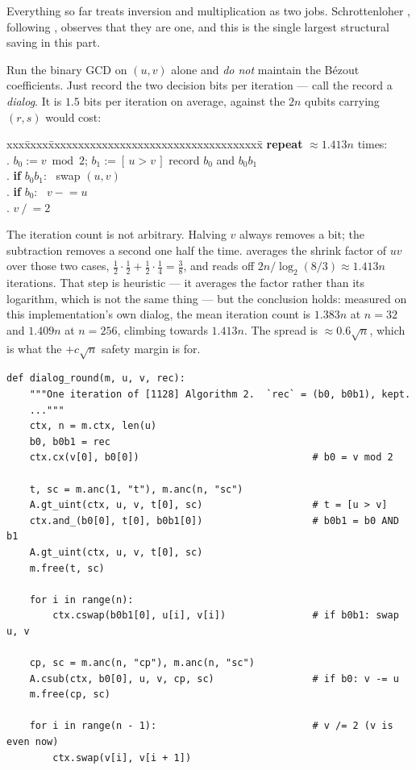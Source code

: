 \documentclass[11pt]{article}
\theoremstyle{plain}
\theoremstyle{remark}
\begin{document}
Everything so far treats inversion and multiplication as two jobs. Schrottenloher
\cite{ec:schrott26}, following \cite{ec:khattar25}, observes that they are one, and this is the
single largest structural saving in this part.

Run the binary GCD on $(u,v)$ alone and \emph{do not} maintain the B\'ezout coefficients. Just
record the two decision bits per iteration --- call the record a \emph{dialog}. It is $1.5$ bits
per iteration on average, against the $2n$ qubits carrying $(r,s)$ would cost:

\begin{center}\small
\begin{minipage}{0.82\textwidth}
\begin{tabbing}
xxx\=xxxx\=xxxxxxxxxxxxxxxxxxxxxxxxxxxxxxxxxxxx\=\kill
\> \textbf{repeat} $\approx1.413n$ times:\\
.\> $b_0 := v \bmod 2$; \quad $b_1 := [\,u>v\,]$ \> record $b_0$ and $b_0b_1$\\
.\> \textbf{if} $b_0b_1$: \ swap $(u,v)$\\
.\> \textbf{if} $b_0$: \ $v \mathrel{-}= u$\\
.\> $v \mathrel{/}= 2$
\end{tabbing}
\end{minipage}
\end{center}

\noindent
The iteration count is not arbitrary. Halving $v$ always removes a bit; the subtraction removes a
second one half the time. \cite{ec:schrott26} averages the shrink factor of $uv$ over those two
cases, $\tfrac12\cdot\tfrac12+\tfrac12\cdot\tfrac14=\tfrac38$, and reads off
$2n/\log_2(8/3)\approx1.413n$ iterations. That step is heuristic --- it averages the factor rather
than its logarithm, which is not the same thing --- but the conclusion holds: measured on this
implementation's own dialog, the mean iteration count is $1.383n$ at $n=32$ and $1.409n$ at
$n=256$, climbing towards $1.413n$. The spread is $\approx0.6\sqrt n$, which is what the $+c\sqrt n$
safety margin is for.

\begin{lstlisting}
def dialog_round(m, u, v, rec):
    """One iteration of [1128] Algorithm 2.  `rec` = (b0, b0b1), kept.
    ..."""
    ctx, n = m.ctx, len(u)
    b0, b0b1 = rec
    ctx.cx(v[0], b0[0])                              # b0 = v mod 2

    t, sc = m.anc(1, "t"), m.anc(n, "sc")
    A.gt_uint(ctx, u, v, t[0], sc)                   # t = [u > v]
    ctx.and_(b0[0], t[0], b0b1[0])                   # b0b1 = b0 AND b1
    A.gt_uint(ctx, u, v, t[0], sc)
    m.free(t, sc)

    for i in range(n):
        ctx.cswap(b0b1[0], u[i], v[i])               # if b0b1: swap u, v

    cp, sc = m.anc(n, "cp"), m.anc(n, "sc")
    A.csub(ctx, b0[0], u, v, cp, sc)                 # if b0: v -= u
    m.free(cp, sc)

    for i in range(n - 1):                           # v /= 2 (v is even now)
        ctx.swap(v[i], v[i + 1])
\end{lstlisting}
\end{document}
